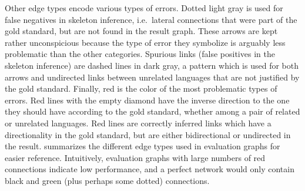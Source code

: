  Other edge types encode various types of errors. Dotted light gray is used for false negatives in skeleton inference, i.e.\ lateral connections that were part of the gold standard, but are not found in the result graph. These arrows are kept rather unconspicious because the type of error they symbolize is arguably less problematic than the other categories. Spurious links (false positives in the skeleton inference) are dashed lines in dark gray, a pattern which is used for both arrows and undirected links between unrelated languages that are not justified by the gold standard. Finally, red is the color of the most problematic types of errors. Red lines with the empty diamond have the inverse direction to the one they should have according to the gold standard, whether among a pair of related or unrelated languages. Red lines are correctly inferred links which have a directionality in the gold standard, but are either bidirectional or undirected in the result.  summarizes the 
different edge types used in evaluation graphs for easier reference. Intuitively, evaluation graphs with large numbers of red connections indicate low performance, and a perfect network would only contain black and green (plus perhaps some dotted) connections.
 
